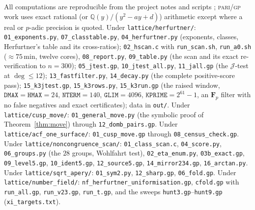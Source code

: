 \documentclass[11pt,reqno]{amsart}
\theoremstyle{plain}
\theoremstyle{definition}
\theoremstyle{remark}
\theoremstyle{plain}
\newcommand{\Q}{\mathbb{Q}}
\begin{document}
{\small
\sloppy\raggedright
All computations are reproducible from the project notes and scripts
\cite{ProjNotes}; \textsc{pari/gp} work uses exact rational (or
$\Q(y)/(y^2-ay+d)$) arithmetic except where a real or $p$-adic precision is
quoted. Under \texttt{lattice/herfurtner/}: \texttt{01\_exponents.py},
\texttt{07\_classtable.py}, \texttt{04\_herfurtner.py} (exponents, classes,
Herfurtner's table and its cross-ratios); \texttt{02\_hscan.c} with
\texttt{run\_scan.sh}, \texttt{run\_a0.sh} ($\approx75$\,min, twelve cores),
\texttt{08\_report.py}, \texttt{09\_table.py} (the scan and its exact
re-verification to $n=300$); \texttt{05\_jtest.gp}, \texttt{10\_jtest\_all.py},
\texttt{11\_jall.gp} (the $\mathcal J$-test at $\deg\le12$);
\texttt{13\_fastfilter.py}, \texttt{14\_decay.py} (the complete positive-score
pass); \texttt{15\_k3jtest.gp}, \texttt{15\_k3rows.py}, \texttt{15\_k3run.gp}
(the raised window, $\mathtt{DMAX}=\mathtt{HMAX}=24$, $\mathtt{NTERM}=140$,
$\mathtt{GLIM}=4096$, $\mathtt{KPRIME}=2^{61}-1$, an $\mathbf F_p$ filter with no
false negatives and exact certificates); data in \texttt{out/}. Under
\texttt{lattice/cusp\_move/}: \texttt{01\_general\_move.py} (the symbolic proof
of Theorem~\ref{thm:move}) through \texttt{12\_domb\_pairs.gp}. Under
\texttt{lattice/acf\_one\_surface/}: \texttt{01\_cusp\_move.gp} through
\texttt{08\_census\_check.gp}. Under \texttt{lattice/noncongruence\_scan/}:
\texttt{01\_class\_scan.c}, \texttt{04\_score.py}, \texttt{06\_groups.py} (the
$28$ groups, Wohlfahrt test), \texttt{02\_eta\_enum.py}, \texttt{03b\_exact.gp},
\texttt{09\_level5.gp}, \texttt{10\_ident5.gp}, \texttt{12\_source5.gp},
\texttt{14\_mirror234.gp}, \texttt{16\_arctan.py}. Under
\texttt{lattice/sqrt\_apery/}: \texttt{01\_sym2.py}, \texttt{12\_sharp.gp},
\texttt{06\_fold.gp}. Under \texttt{lattice/number\_field/}:
\texttt{nf\_herfurtner\_uniformisation.gp}, \texttt{cfold.gp} with
\texttt{run\_all.gp}, \texttt{run\_v23.gp}, \texttt{run\_t.gp}, and the sweeps
\texttt{hunt3.gp}--\texttt{hunt9.gp} (\texttt{xi\_targets.txt}).
}
\end{document}

